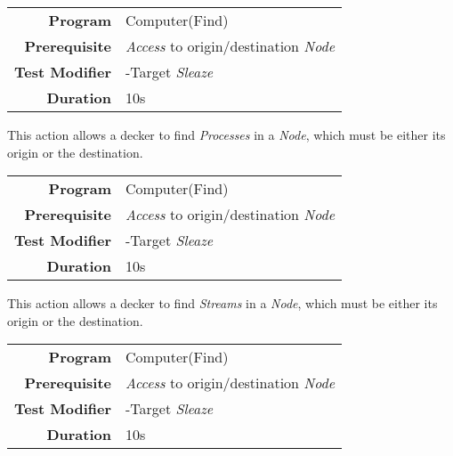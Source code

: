 \label{par:find process}


\begin{tabular}{rl}
    \textbf{Program}       & Computer(Find)                                  \\
    \textbf{Prerequisite}  & \emph{Access} to origin/destination \emph{Node} \\
    \textbf{Test Modifier} & -Target \emph{Sleaze}                           \\
    \textbf{Duration}      & 10s                                             \\
\end{tabular}

\hfill

This action allows a decker to find \emph{Processes} in a \emph{Node}, which must be either its
origin or the destination.

\label{par:find stream}


\begin{tabular}{rl}
    \textbf{Program}       & Computer(Find)                                  \\
    \textbf{Prerequisite}  & \emph{Access} to origin/destination \emph{Node} \\
    \textbf{Test Modifier} & -Target \emph{Sleaze}                           \\
    \textbf{Duration}      & 10s                                             \\
\end{tabular}

\hfill

This action allows a decker to find \emph{Streams} in a \emph{Node}, which must be either its
origin or the destination.

\label{par:find file}

\begin{tabular}{rl}
    \textbf{Program}       & Computer(Find)                                  \\
    \textbf{Prerequisite}  & \emph{Access} to origin/destination \emph{Node} \\
    \textbf{Test Modifier} & -Target \emph{Sleaze}                           \\
    \textbf{Duration}      & 10s                                             \\
\end{tabular}

